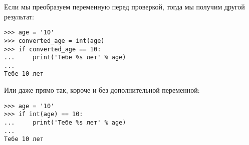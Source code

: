 Если мы преобразуем переменную перед проверкой, тогда мы получим другой результат:

\begin{listing}
\begin{verbatim}
>>> age = '10'
>>> converted_age = int(age)
>>> if converted_age == 10:
...     print('Тебе %s лет' % age)
...
Тебе 10 лет
\end{verbatim}
\end{listing}

Или даже прямо так, короче и без дополнительной переменной:

\begin{listing}
\begin{verbatim}
>>> age = '10'
>>> if int(age) == 10:
...     print('Тебе %s лет' % age)
...
Тебе 10 лет
\end{verbatim}
\end{listing}

